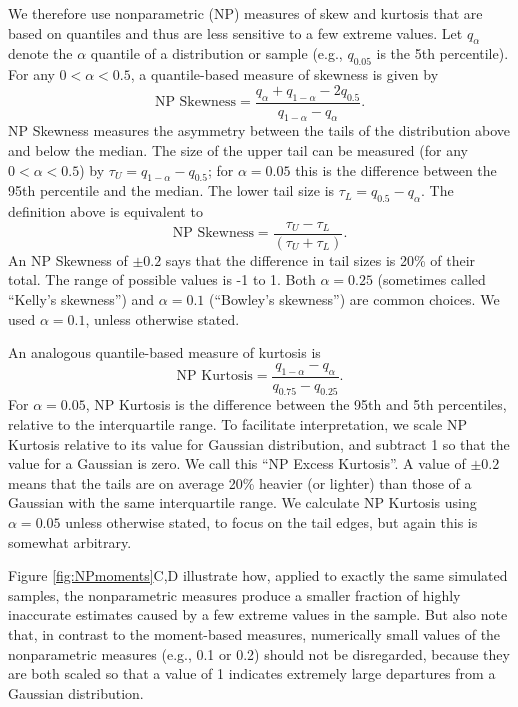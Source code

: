 \documentclass[12pt]{article}
\newcounter{box}
\newcommand{\be}{\begin{equation}}
\newcommand{\ee}{\end{equation}}
\begin{document}
We therefore use nonparametric (NP) measures of skew and kurtosis that are based on quantiles and thus are less sensitive to a few extreme values. 
Let $q_\alpha$ denote the $\alpha$ quantile of a distribution or sample (e.g., $q_{0.05}$ is the 5th percentile). 
For any $0 < \alpha < 0.5$, a quantile-based measure of skewness is given by \citep{mcgillivray-1986}
\be
\mbox{NP Skewness} = \frac{q_\alpha + q_{1-\alpha} - 2 q_{0.5}}{q_{1-\alpha} - q_\alpha}.
\ee
NP Skewness measures the asymmetry between the tails of the distribution above and below the median. 
The size of the upper tail can be measured (for any $0 < \alpha < 0.5$) by $\tau_U = q_{1-\alpha} - q_{0.5}$; for $\alpha=0.05$ this is the difference
between the 95th percentile and the median. 
The lower tail size is $\tau_L = q_{0.5} - q_\alpha$. The definition above is equivalent to  
\be
\mbox{NP Skewness} = \frac{\tau_U - \tau_L}{(\tau_U + \tau_L)}.
\label{eqn:NPskew}
\ee
An NP Skewness of $\pm 0.2$ says that the difference in tail sizes is 20\% of their total. 
The range of possible values is -1 to 1. Both $\alpha=0.25$ (sometimes called ``Kelly's skewness'') and $\alpha=0.1$ (``Bowley's skewness'') are common choices. 
We used $\alpha=0.1$, unless otherwise stated.  
 
An analogous quantile-based measure of kurtosis \citep{jones-etal-1994} is 
\be
\mbox{NP Kurtosis}  = \frac{q_{1-\alpha} - q_{\alpha}}{q_{0.75} - q_{0.25}}.
\label{eqn:NPkurt}
\ee
For $\alpha=0.05$, NP Kurtosis is the difference between the 95th and 5th percentiles, relative to the interquartile range. 
To facilitate interpretation, we scale NP Kurtosis relative to its value for Gaussian distribution, and subtract 1 so that the value for a Gaussian is zero. 
We call this ``NP Excess Kurtosis''. 
A value of $\pm 0.2$ means that the tails are on average 20\% heavier (or lighter) than those of a Gaussian with the same interquartile range. 
We calculate NP Kurtosis using $\alpha=0.05$ unless otherwise stated, to focus on the tail edges, but again this is somewhat arbitrary. 

Figure \ref{fig:NPmoments}C,D illustrate how, applied to exactly the same simulated samples, the nonparametric measures produce a smaller fraction of highly inaccurate estimates caused by a few extreme values in the sample. 
But also note that, in contrast to the moment-based measures, numerically small values of the nonparametric measures (e.g., 0.1 or 0.2) should not be disregarded, because they are both scaled so that a value of 1 indicates extremely large departures from a Gaussian distribution. 
\end{document}
